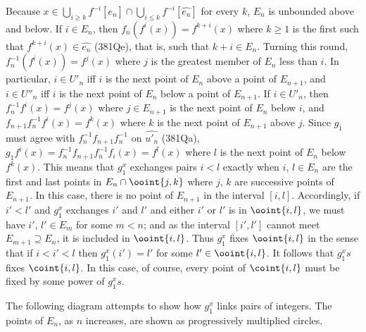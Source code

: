 {


\noindent Because $x\in\bigcup_{i\ge k}f^{-i}[\widehat{e_n}]
\cap\bigcup_{i\le k}f^{-i}[\widehat{e_n}]$ for every $k$, $E_n$ is
unbounded above and
below.   If $i\in E_n$, then $f_n(f^i(x))=f^{k+i}(x)$ where
$k\ge 1$ is the first such that $f^{k+i}(x)\in\widehat{e_n}$ (381Qe),
that is, such that $k+i\in E_n$.   Turning this round,
$f_n^{-1}(f^i(x))=f^j(x)$ where $j$ is the greatest member of $E_n$ less
than $i$.   In particular, $i\in U'_n$ iff $i$ is the next point of
$E_n$ above a point of $E_{n+1}$, and $i\in U''_n$ iff $i$ is the next
point of $E_n$ below a point of $E_{n+1}$.   If $i\in U'_n$, then
$f_n^{-1}f^i(x)=f^j(x)$ where $j\in E_{n+1}$ is the next point of $E_n$
below $i$, and
$f_{n+1}f_n^{-1}f^i(x)=f^k(x)$ where $k$ is the next point of $E_{n+1}$
above $j$.   Since $g_1$ must agree with $f_n^{-1}f_{n+1}f_n^{-1}$ on
$\widehat{u'_n}$ (381Qa),
$g_1f^i(x)=f_n^{-1}f_{n+1}f_n^{-1}f_i(x)=f^l(x)$ where $l$ is the next
point of $E_n$ below $f^k(x)$.    This means that $g_1^x$ exchanges
pairs $i<l$ exactly when $i$, $l\in E_n$ are the first and last
points in $E_n\cap\ooint{j,k}$ where $j$, $k$ are successive points of
$E_{n+1}$.   In this case, there is no point of $E_{n+1}$ in the
interval $[i,l]$.   Accordingly, if $i'<l'$ and $g_1^x$ exchanges
$i'$ and $l'$ and either $i'$ or $l'$ is in $\ooint{i,l}$,
we must have $i'$, $l'\in E_m$ for some $m<n$;  and as the interval
$[i',l']$ cannot meet $E_{m+1}\supseteq E_n$, it is included in
$\ooint{i,l}$.   Thus $g_1^x$ fixes $\ooint{i,l}$ in the sense that if
$i<i'<l$ then $g_1^x(i')=l'$ for some $l'\in\ooint{i,l}$.
It follows that $g_1^xs$ fixes $\coint{i,l}$.   In this case, of course,
every point of $\coint{i,l}$ must be fixed by some power of
$g_1^xs$.

The following diagram attempts to show how $g_1^x$ links pairs of
integers.   The points of $E_n$, as $n$ increases, are shown as
progressively multiplied circles.


}
